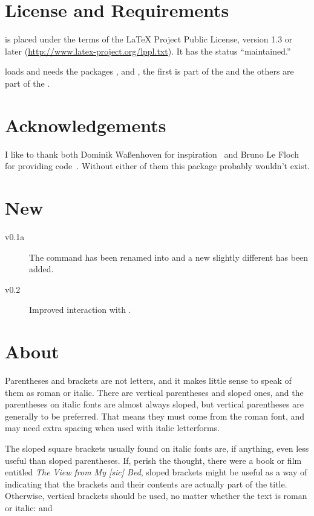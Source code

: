 \documentclass[DIV10,toc=index,toc=bib]{cnpkgdoc}
\begin{document}
\section{License and Requirements}
\embrac is placed under the terms of the LaTeX Project Public License,
version 1.3 or later (\url{http://www.latex-project.org/lppl.txt}).
It has the status ``maintained.''

\embrac loads and needs the packages ,  and
, the first is part of the  and the others are
part of the .

\section{Acknowledgements}
I like to thank both Dominik Waßenhoven for inspiration~\cite{dtk12-dw} and
Bruno Le Floch for providing code~\cite{lefloch11}. Without either of them this
package probably wouldn't exist.

\section{New}
\begin{description}
 \item[v0.1a] The command  has been renamed into
    and a new slightly different  has been added.
 \item[v0.2] Improved interaction with .
\end{description}

\section{About}\label{sec:about}
\begin{zitat}
 Parentheses and brackets are not letters, and it makes little sense to speak of
 them as roman or italic. There are vertical parentheses and sloped ones, and
 the parentheses on italic fonts are almost always sloped, but vertical parentheses
 are generally to be preferred. That means they must come from the roman font,
 and may need extra spacing when used with italic letterforms.
 
 The sloped square brackets usually found on italic fonts are, if anything, even
 less useful than sloped parentheses. If, perish the thought, there were a book
 or film entitled \emph*{The View from My [sic] Bed}, sloped brackets might be
 useful as a way of indicating that the brackets and their contents are actually
 part of the title. Otherwise, vertical brackets should be used, no matter whether
 the text is roman or italic:  and
\end{zitat}
\end{document}
